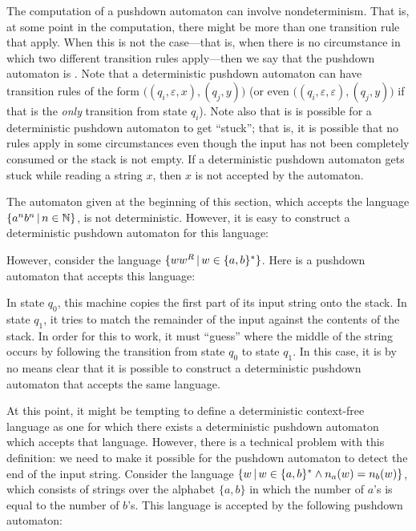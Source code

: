 \bigbreak

The computation of a pushdown automaton can involve nondeterminism.
That is, at some point in the computation, there might be more than
one transition rule that apply.  When this is not the case---that is,
when there is no circumstance in which two different transition rules
apply---then we say that the pushdown automaton is .
Note that a deterministic pushdown automaton can have transition
rules of the form $\big((q_i,\varepsilon,x),(q_j,y)\big)$ (or
even $\big((q_i,\varepsilon,\varepsilon),(q_j,y)\big)$ if that is
the \emph{only} transition from state $q_i$).  Note also that is is possible
for a deterministic pushdown automaton to get ``stuck''; that is, it
is possible that no rules apply in some circumstances even though the
input has not been completely consumed or the stack is not empty.
If a deterministic pushdown automaton gets stuck while reading a string
$x$, then $x$ is not accepted by the automaton.

The automaton given at the beginning of this section,
which accepts the language $\{a^nb^n\,|\, n\in{\mathbb N}\}$, 
is not deterministic.  However, it is easy to construct a deterministic
pushdown automaton for this language:

\medskip
\centerline{}
\smallskip

\noindent However, consider the language $\{ww^R\,|\, w\in\{a,b\}^*\}$.  Here is
a pushdown automaton that accepts this language:

\medskip
\centerline{}
\smallskip

\noindent In state $q_0$, this machine copies the first part of its input
string onto the stack.  In state $q_1$, it tries to match the remainder of the
input against the contents of the stack.  In order for this to work, it must ``guess''
where the middle of the string occurs by following the transition
from state $q_0$ to state $q_1$.  
In this case, it is by no means clear that it is possible to
construct a deterministic pushdown automaton that accepts the same
language.

\medbreak

At this point, it might be tempting to define a deterministic context-free
language as one for which there exists a deterministic pushdown automaton
which accepts that language.  However, there is a technical problem with
this definition:  we need to make it possible for the pushdown automaton
to detect the end of the input string.  Consider the language
$\{w\,|\, w\in\{a,b\}^* \wedge n_a(w)=n_b(w)\}$, which consists of strings over the
alphabet $\{a,b\}$ in which the number of $a$'s is equal to the number
of $b$'s.  This language is accepted by the following pushdown automaton:

